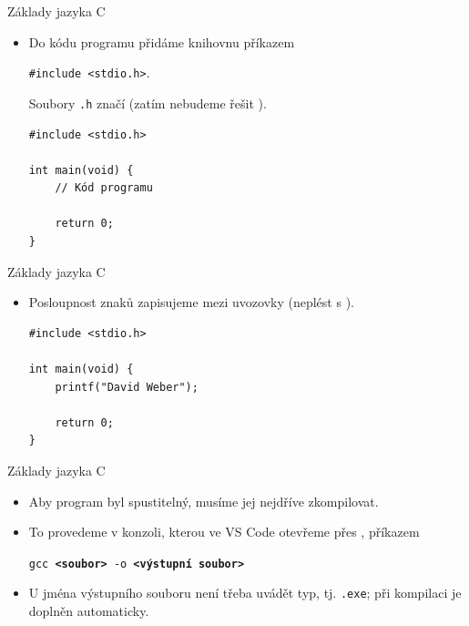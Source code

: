 \documentclass[14pt]{beamer}
\begin{document}
    \begin{frame}[t,fragile]{Základy jazyka C}
        \begin{itemize}
            \item Do kódu programu přidáme knihovnu příkazem
            \begin{center}
                \texttt{\#include <stdio.h>}.
            \end{center}
            Soubory \texttt{.h} značí  (zatím nebudeme řešit ).
            \begin{lstlisting}
#include <stdio.h>

int main(void) {
    // Kód programu

    return 0;
}
            \end{lstlisting}
        \end{itemize}
    \end{frame}

    \begin{frame}[t,fragile]{Základy jazyka C}
        \begin{itemize}
            \item Posloupnost znaků zapisujeme mezi uvozovky \markorange{\textquotedbl{} \textquotedbl} (neplést s ).
            \begin{lstlisting}
#include <stdio.h>

int main(void) {
    printf("David Weber");

    return 0;
}
            \end{lstlisting}
        \end{itemize}
    \end{frame}

    \begin{frame}[t]{Základy jazyka C}
        \begin{itemize}
            \item Aby program byl spustitelný, musíme jej nejdříve zkompilovat.
            \item To provedeme v konzoli, kterou ve VS Code otevřeme přes , příkazem
            \begin{center}
                \texttt{gcc \textbf{<soubor>} -o \textbf{<výstupní soubor>}}
            \end{center}
            \item U jména výstupního souboru není třeba uvádět typ, tj. \texttt{.exe}; při kompilaci je doplněn automaticky. 
        \end{itemize}
    \end{frame}
\end{document}

